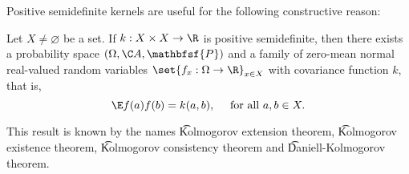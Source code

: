 Positive semidefinite kernels are useful for the following constructive reason:

\begin{proposition}
Let $X \neq \varnothing$ be a set.
If $k: X \times X \to \R $ is positive semidefinite, then there exists a probability space $(\Omega , \C A, \mathbfsf{P} )$ and a family of zero-mean normal real-valued random variables $\set{f_x: \Omega  \to \R }_{x \in X}$ with covariance function $k$, that is,
  \[
\E  f(a)f(b) = k(a, b), \quad \text{ for all } a, b \in X.
  \]\end{proposition}
This result is known by the names \t{Kolmogorov extension theorem}, \t{Kolmogorov existence theorem}, \t{Kolmogorov consistency theorem} and \t{Daniell-Kolmogorov theorem}.
\blankpage